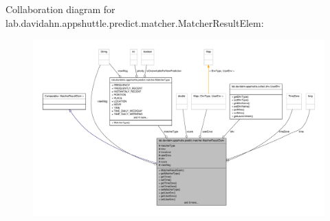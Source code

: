 \-Collaboration diagram for lab.\-davidahn.\-appshuttle.\-predict.\-matcher.\-Matcher\-Result\-Elem\-:
\nopagebreak
\begin{figure}[H]
\begin{center}
\leavevmode
\includegraphics[width=350pt]{classlab_1_1davidahn_1_1appshuttle_1_1predict_1_1matcher_1_1_matcher_result_elem__coll__graph}
\end{center}
\end{figure}
